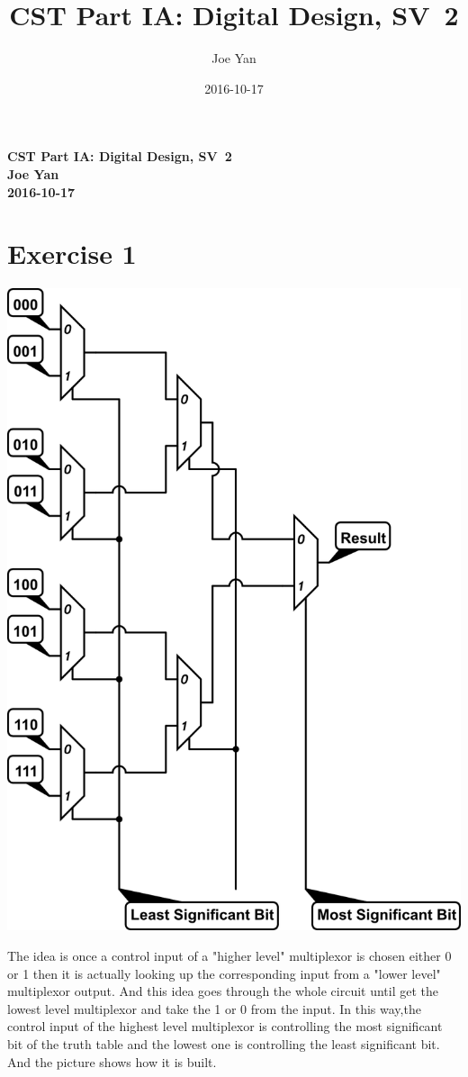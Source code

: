 \documentclass[10pt,twoside,a4paper]{article}
\newcommand{\studentname}{Joe Yan}
\newcommand{\svworkdate}{2016-10-17}
\newcommand{\svcourse}{CST Part IA: Digital Design}
\newcommand{\svnumber}{2}
\begin{document}
\author{\studentname}
\title{\svcourse, SV~\svnumber}
\date{\svworkdate}

\textbf{\svcourse, SV~\svnumber}\\
\textbf{\studentname}\\
\textbf{\svworkdate}\\

\section*{Exercise 1}

\includegraphics[scale=0.9]{sv2-1.png} 

The idea is once a control input of a "higher level" multiplexor is chosen either 0 or 1 then it is actually looking up the corresponding input from a "lower level" multiplexor output. And this idea goes through the whole circuit until get the lowest level multiplexor and take the 1 or 0 from the input. In this way,the control input of the highest level multiplexor is controlling the most significant bit of the truth table and the lowest one is controlling the least significant bit. \\
And the picture shows how it is built.
\end{document}
